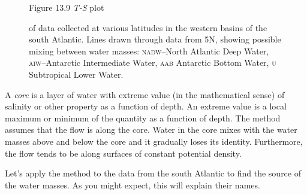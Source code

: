 \begin{figure}[t!]
\footnotesize
Figure 13.9 \textit{T-S} plot \rule{0mm}{3ex}of data collected at
various latitudes in the western basins of the south Atlantic. Lines
drawn through data from 5\degrees N, showing possible
mixing between water masses:
\textsc{nadw}--North Atlantic Deep Water, \textsc{aiw}--Antarctic
Intermediate Water, \textsc{aab} Antarctic Bottom Water, \textsc{u} Subtropical Lower Water.
\label{fig:WesternBasinsTS}
\vspace{-4ex}
\end{figure}

A \textit{core} is a layer of water with extreme
value (in the mathematical sense) of salinity or other property as a
function of depth. An extreme value is a local maximum or minimum of
the quantity as a function of depth. The method assumes that the flow
is along the core. Water in the core mixes with the water masses above
and below the core and it gradually loses its identity. Furthermore,
the flow tends to be along surfaces of constant potential density.

Let's apply the method to the data from the south Atlantic to find the
source of the water masses. As you might expect,
this will explain their names.

